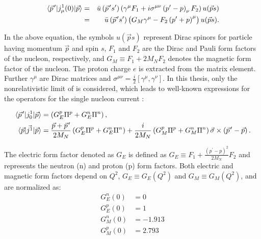     \begin{equation}
        \begin{aligned}
        \matrixel{\pvec{p}} {j^1_\mu(0)} {\vec{p}} & =& \bar{u}\left(\pvec{p} s^{\prime}\right)\left(\gamma^\mu F_1+i \sigma^{\mu \nu}\left(p^{\prime}-p\right)_\nu F_2\right) u(\vec{p} s) \\
        & =&\bar{u}\left(\pvec{p} s^{\prime}\right)\left(G_M \gamma^\mu-F_2\left(p^{\prime}+p\right)^\mu\right) u(\vec{p} s) .
        \end{aligned}
        \label{current_general}       
    \end{equation}
    
    In the above equation,
    the symbols $u(\vec{p} s)$ represent Dirac spinors
    for particle having momentum $\vec{p}$ and spin $s$, 
    $F_1$ and $F_2$ are the Dirac and Pauli form factors of the nucleon, respectively, and $G_M \equiv F_1+2 M_N F_2$ denotes the magnetic form factor of the nucleon. 
    The proton charge $e$ is extracted from the matrix element. Further $\gamma^\mu$ are Dirac matrices 
    and $\sigma^{\mu\nu} = \frac{i}{2}\left[\gamma^\mu, \gamma^\nu\right]$.
    In this thesis, only the nonrelativistic limit of  is considered, which leads to well-known expressions for the operators for the single nucleon current \cite{Golak2005}:


    \begin{align}
            \matrixel*{\pvec{p}} {j^1_0} {\vec{p}} &=\left(G_E^p \Pi^p+G_E^n \Pi^n\right), \\
            \matrixel{\vec{p}} {\vec{j^1}} {\vec{p}} &=\frac{\vec{p}+\pvec{p}}{2 M_N}\left(G_E^p \Pi^p+G_E^n \Pi^n\right)+\frac{i}{2 M_N}\left(G_M^p \Pi^p+G_M^n \Pi^n\right) \vec{\sigma} \times\left(\pvec{p}-\vec{p}\right) .
        \label{snc_formfact}
    \end{align}

    The electric form factor denoted as $G_E$ is defined as
    $G_E \equiv F_1+\frac{\left(p^{\prime}-p\right)^2}{2 M_N} F_2$ and 
    represents the neutron (n) and proton (p) form factors.
    Both electric and magnetic form factors depend on $Q^2$, $G_E \equiv G_E(Q^2)$ and $G_M \equiv G_M(Q^2)$,
    and are normalized as:
    \begin{equation}
        \begin{aligned}
        G_E^n(0) & =0 \\
        G_E^p(0) & =1 \\
        G_M^n(0) & =-1.913 \\
        G_M^p(0) & =2.793
        \end{aligned}
    \end{equation}


